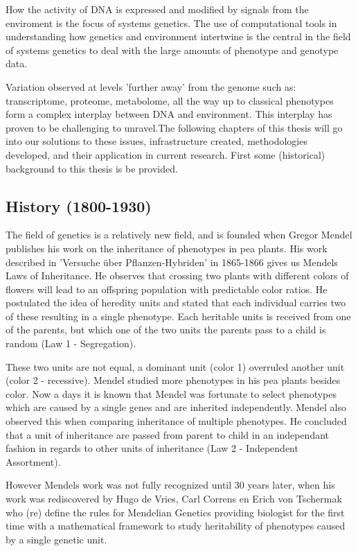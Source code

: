 How the activity of DNA is expressed and modified by signals from the enviroment is the 
focus of systems genetics. The use of computational tools in understanding how genetics 
and environment intertwine is the central in the field of systems genetics to deal with the 
large amounts of phenotype and genotype data.

Variation observed at levels 'further away' from the genome such as: transcriptome, 
proteome, metabolome, all the way up to classical phenotypes form a complex interplay 
between DNA and environment. This interplay has proven to be challenging to unravel.The 
following chapters of this thesis will go into our solutions to these issues, 
infrastructure created, methodologies developed, and their application in current 
research. First some (historical) background to this thesis is be provided.

\subsection{History (1800-1930)}

The field of genetics is a relatively new field, and is founded when Gregor 
Mendel publishes his work on the inheritance of phenotypes in pea plants. 
His work described in 'Versuche \"uber Pflanzen-Hybriden' in 1865-1866 
\cite{Mendel:1866} gives us Mendels Laws of Inheritance. He observes that 
crossing two plants with different colors of flowers will lead to an offspring 
population with predictable color ratios. He postulated the idea of heredity 
units and stated that each individual carries two of these resulting in a 
single phenotype. Each heritable units is received from one of the parents, 
but which one of the two units the parents pass to a child is random 
(Law 1 - Segregation).

These two units are not equal, a dominant unit (color 1) overruled another 
unit (color 2 - recessive). Mendel studied more phenotypes in his pea plants 
besides color. Now a days it is known that Mendel was fortunate to select 
phenotypes which are caused by a single genes and are inherited independently. 
Mendel also observed this when comparing inheritance of multiple phenotypes. 
He concluded that a unit of inheritance are passed from parent to child in an 
independant fashion in regards to other units of inheritance 
(Law 2 - Independent Assortment).

However Mendels work was not fully recognized until 30 years later, when his work was 
rediscovered by Hugo de Vries, Carl Correns en Erich von Tschermak who (re) define the 
rules for Mendelian Genetics \cite{deVries:1889} providing biologist for the first 
time with a mathematical framework to study heritability of phenotypes caused by a 
single genetic unit.

